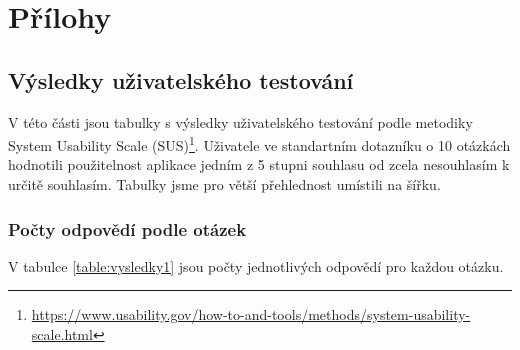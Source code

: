 \documentclass[12pt,a4paper]{report}
\begin{document}
\appendix
\chapter{Přílohy}

\section{Výsledky uživatelského testování}

V této části jsou tabulky s výsledky uživatelského testování podle metodiky System Usability Scale (SUS)\footnote{\url{https://www.usability.gov/how-to-and-tools/methods/system-usability-scale.html}}. Uživatele ve standartním dotazníku o 10 otázkách hodnotili použitelnost aplikace jedním z 5 stupni souhlasu od zcela nesouhlasím k určitě souhlasím. Tabulky jsme pro větší přehlednost umístili na šířku.

\subsection{Počty odpovědí podle otázek}

V tabulce \ref{table:vysledky1} jsou počty jednotlivých odpovědí pro každou otázku.  

\end{document}
